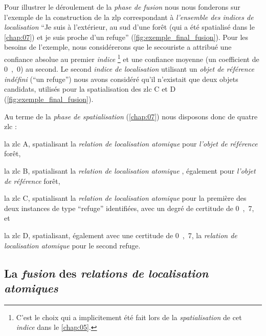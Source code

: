 Pour illustrer le déroulement de la \emph{phase de fusion} nous nous
fonderons sur l'exemple de la construction de la \ac{zlp}
correspondant à \emph{l'ensemble des indices de localisation}
\enquote{Je suis à l'extérieur, au sud d'une forêt (qui a été
  spatialisé dans le \autoref{chap:07}) et je suis proche d'un refuge}
(\autoref{fig:exemple_final_fusion}). Pour les besoins de l'exemple,
nous considérerons que le secouriste a attribué une confiance absolue
au premier \emph{indice} \footnote{C'est le choix qui a implicitement
  été fait lors de la \emph{spatialisation} de cet \emph{indice} dans
  le \autoref{chap:05}.} et une confiance moyenne (\ie un coefficient
de \si{0,0}) au second. Le second \emph{indice de localisation}
utilisant un \emph{objet de référence indéfini} (\eg \enquote{un
  refuge}) nous avons considéré qu'il n'existait que deux objets
candidats, utilisés pour la spatialisation des \ac{zlc}
\textcolor{RdBu-9-8}{\textsf{C}} et \textcolor{RdBu-9-9}{\textsf{D}}
(\autoref{fig:exemple_final_fusion}).

Au terme de la \emph{phase de spatialisation} (\autoref{chap:07}) nous
disposons donc de quatre \ac{zlc} :
% 
\begin{enumerate*}[label=(\arabic*)]
\item la \ac{zlc} \textcolor{RdBu-9-1}{\textsf{A}}, spatialisant la
  \emph{relation de localisation atomique}  pour
  \emph{l'objet de référence} forêt,
\item la \ac{zlc} \textcolor{RdBu-9-2}{\textsf{B}}, spatialisant la \emph{relation de localisation
    atomique} , également pour \emph{l'objet de
    référence} forêt,
\item la \ac{zlc} \textcolor{RdBu-9-8}{\textsf{C}}, spatialisant la
  \emph{relation de localisation atomique}  pour
  la première des deux instances de type \enquote{refuge} identifiées,
  avec un degré de certitude de \si{0,7}, et
\item la \ac{zlc} \textcolor{RdBu-9-9}{\textsf{D}}, spatialisant,
  également avec une certitude de \si{0,7}, la \emph{relation de
    localisation atomique}  pour le second
  refuge.
\end{enumerate*}

\subsection{La \emph{fusion} des \emph{relations de localisation
    atomiques}}

